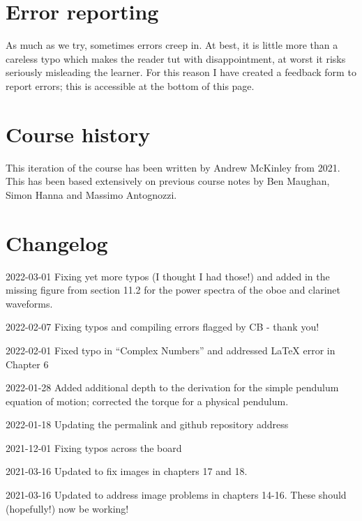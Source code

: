 \documentclass[
]{book}
\begin{document}
\hypertarget{error-reporting}{%
\section*{Error reporting}\label{error-reporting}}

As much as we try, sometimes errors creep in. At best, it is little more than a careless typo which makes the reader tut with disappointment, at worst it risks seriously misleading the learner. For this reason I have created a feedback form to report errors; this is accessible at the bottom of this page.

\hypertarget{course-history}{%
\section*{Course history}\label{course-history}}

This iteration of the course has been written by Andrew McKinley from 2021. This has been based extensively on previous course notes by Ben Maughan, Simon Hanna and Massimo Antognozzi.

\hypertarget{sec:changelog}{%
\section*{Changelog}\label{sec:changelog}}

2022-03-01 Fixing yet more typos (I thought I had those!) and added in the missing figure from section 11.2 for the power spectra of the oboe and clarinet waveforms.

2022-02-07 Fixing typos and compiling errors flagged by CB - thank you!

2022-02-01 Fixed typo in ``Complex Numbers'' and addressed LaTeX error in Chapter 6

2022-01-28 Added additional depth to the derivation for the simple pendulum equation of motion; corrected the torque for a physical pendulum.

2022-01-18 Updating the permalink and github repository address

2021-12-01 Fixing typos across the board

2021-03-16 Updated to fix images in chapters 17 and 18.

2021-03-16 Updated to address image problems in chapters 14-16. These should (hopefully!) now be working!
\end{document}
